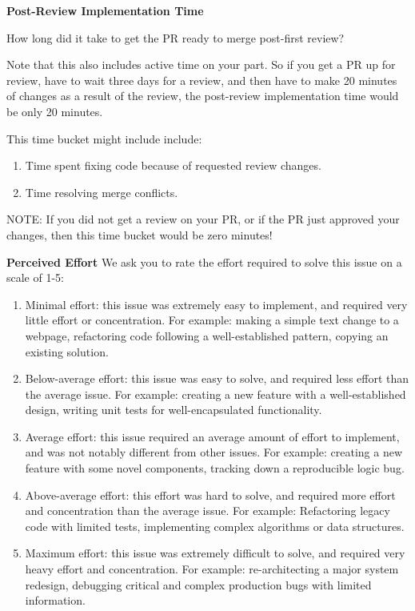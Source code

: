 \documentclass{article}
\begin{document}
\begin{instructionbox}
\textbf{Post-Review Implementation Time}

How long did it take to get the PR ready to merge post-first review?

Note that this also includes active time on your part. So if you get a PR up for review, have to wait three days for a review, and then have to make 20 minutes of changes as a result of the review, the post-review implementation time would be only 20 minutes.

This time bucket might include include:
\begin{enumerate}
    \item Time spent fixing code because of requested review changes.
    \item Time resolving merge conflicts.
\end{enumerate}
NOTE: If you did not get a review on your PR, or if the PR just approved your changes, then this time bucket would be zero minutes!

\textbf{Perceived Effort}
We ask you to rate the effort required to solve this issue on a scale of 1-5:
\begin{enumerate}
    \item Minimal effort: this issue was extremely easy to implement, and required very little effort or concentration. For example: making a simple text change to a webpage, refactoring code following a well-established pattern, copying an existing solution.
    \item Below-average effort: this issue was easy to solve, and required less effort than the average issue. For example: creating a new feature with a well-established design, writing unit tests for well-encapsulated functionality.
    \item Average effort: this issue required an average amount of effort to implement, and was not notably different from other issues. For example: creating a new feature with some novel components, tracking down a reproducible logic bug. 
    \item Above-average effort: this effort was hard to solve, and required more effort and concentration than the average issue. For example: Refactoring legacy code with limited tests, implementing complex algorithms or data structures.
    \item Maximum effort: this issue was extremely difficult to solve, and required very heavy effort and concentration. For example: re-architecting a major system redesign, debugging critical and complex production bugs with limited information.
\end{enumerate}

\end{instructionbox}
\end{document}
